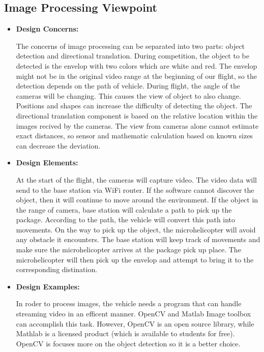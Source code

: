 \documentclass[onecolumn, draftclsnofoot,10pt, compsoc]{IEEEtran}
\begin{document}
\subsection{Image Processing Viewpoint}
\begin{itemize}
\item{ \textbf{Design Concerns:}}

The concerns of image processing can be separated into two parts: object detection and directional translation. During competition, the object to be detected is the envelop with two colors which are white and red. The envelop might not be in the original video range at the beginning of our flight, so the detection depends on the path of vehicle. During flight, the angle of the cameras will be changing. This causes the view of object to also change. Positions and shapes can increase the difficulty of detecting the object. The directional translation component is based on the relative location within the images recived by the cameras. The view from cameras alone cannot estimate exact distances, so sensor and mathematic calculation based on known sizes can decrease the deviation. \\

\item{ \textbf{Design Elements:}}

At the start of the flight, the cameras will capture video. The video data will send to the base station via WiFi router. If the software cannot discover the object, then it will continue to move around the environment. If the object in the range of camera, base station will calculate a path to pick up the package. According to the path, the vehicle will convert this path into movements. On the way to pick up the object, the microhelicopter will avoid any obstacle it encounters. The base station will keep track of movements and make sure the microhelicopter arrives at the package pick up place. The microhelicopter will then pick up the envelop and attempt to bring it to the corresponding distination. \\ 
\item{ \textbf{Design Examples:}} %

In roder to process images, the vehicle needs a program that can handle streaming video in an efficent manner. OpenCV and Matlab Image toolbox can accomplish this task. However, OpenCV is an open source library, while Mathlab is a licensed product (which is available to students for free). OpenCV is focuses more on the object detection so it is a better choice.\\
\end{itemize}
\end{document}
